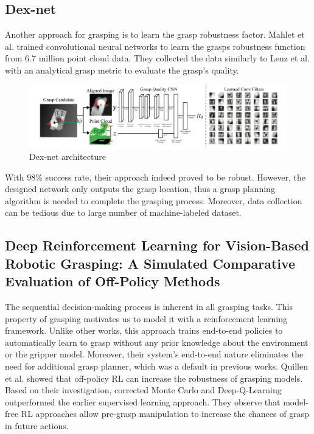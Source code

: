 \subsection{Dex-net}

Another approach for grasping is to learn the grasp robustness factor. Mahlet et al.  trained convolutional neural networks to learn the grasps robustness function from 6.7 million point cloud data. They collected the data similarly to Lenz et al. with an analytical grasp metric to evaluate the grasp's quality. 

\begin{figure}[htbp]
    \centering
    \includegraphics[width=1.\textwidth]{figures/dexnet}
    \caption{Dex-net architecture \cite{Lenz2013}}
    \label{fig:dexnet}
\end{figure}

With \(98\%\) success rate, their approach indeed proved to be robust. However, the designed network only outputs the grasp location, thus a grasp planning algorithm is needed to complete the grasping process. Moreover, data collection can be tedious due to large number of machine-labeled dataset.


\subsection{Deep Reinforcement Learning for Vision-Based Robotic Grasping: A Simulated Comparative Evaluation of Off-Policy Methods}

The sequential decision-making process is inherent in all grasping tasks. This property of grasping motivates us to model it with a reinforcement learning framework. Unlike other works, this approach trains end-to-end policies to automatically learn to grasp without any prior knowledge about the environment or the gripper model. Moreover, their system's end-to-end nature eliminates the need for additional grasp planner, which was a default in previous works. 
Quillen et al. showed that off-policy RL can increase the robustness of grasping models. Based on their investigation, corrected Monte Carlo and Deep-Q-Learning outperformed the earlier supervised learning approach. They observe that model-free RL approaches allow pre-grasp manipulation to increase the chances of grasp in future actions. 

